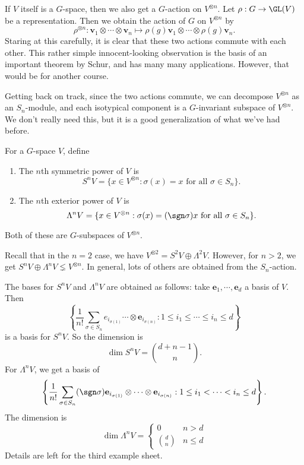 \documentclass[a4paper]{article}
\begin{document}
If $V$ itself is a $G$-space, then we also get a $G$-action on $V^{\otimes n}$. Let $\rho: G \to \GL(V)$ be a representation. Then we obtain the action of $G$ on $V^{\otimes n}$ by
\[
  \rho^{\otimes n}: \mathbf{v}_1 \otimes \cdots \otimes \mathbf{v}_n \mapsto \rho(g) \mathbf{v}_1 \otimes \cdots \otimes \rho(g) \mathbf{v}_n.
\]
Staring at this carefully, it is clear that these two actions commute with each other. This rather simple innocent-looking observation is the basis of an important theorem by Schur, and has many many applications. However, that would be for another course.

Getting back on track, since the two actions commute, we can decompose $V^{\otimes n}$ as an $S_n$-module, and each isotypical component is a $G$-invariant subspace of $V^{\otimes n}$. We don't really need this, but it is a good generalization of what we've had before.

\begin{defi}
  For a $G$-space $V$, define
  \begin{enumerate}
    \item The $n$th symmetric power of $V$ is
      \[
        S^n V = \{x \in V^{\otimes n}: \sigma(x) = x\text{ for all }\sigma \in S_n\}.
      \]
    \item The $n$th exterior power of $V$ is
      \[
        \Lambda^n V = \{x \in V^{\otimes n}: \sigma(x) = (\sgn \sigma) x \text{ for all }\sigma \in S_n\}.
      \]
  \end{enumerate}
  Both of these are $G$-subspaces of $V^{\otimes n}$.
\end{defi}
Recall that in the $n = 2$ case, we have $V^{\otimes 2} = S^2 V \oplus \Lambda^2 V$. However, for $n > 2$, we get $S^n V \oplus \Lambda^n V \lneq V^{\otimes n}$. In general, lots of others are obtained from the $S_n$-action.

\begin{eg}
  The bases for $S^n V$ and $\Lambda^n V$ are obtained as follows: take $\mathbf{e}_1, \cdots, \mathbf{e}_d$ a basis of $V$. Then
  \[
    \left\{\frac{1}{n!}\sum_{\sigma \in S_n} e_{i_{\sigma(1)}} \cdots \otimes \mathbf{e}_{i_{\sigma(n)}} : 1 \leq i_1 \leq \cdots \leq i_n \leq d\right\}
  \]
  is a basis for $S^n V$. So the dimension is
  \[
    \dim S^n V = \binom{d + n - 1}{n}.
  \]
  For $\Lambda^n V$, we get a basis of
  \[
    \left\{\frac{1}{n!} \sum_{\sigma \in S_n} (\sgn \sigma) \mathbf{e}_{i_{\sigma(1)}} \otimes \cdots \otimes \mathbf{e}_{i_{\sigma(n)}}: 1 \leq i_1 < \cdots < i_n \leq d\right\}.
  \]
  The dimension is
  \[
    \dim \Lambda^n V =
    \begin{cases}
      0 & n > d\\
      \binom{d}{n} & n \leq d
    \end{cases}
  \]
  Details are left for the third example sheet.
\end{eg}
\end{document}
